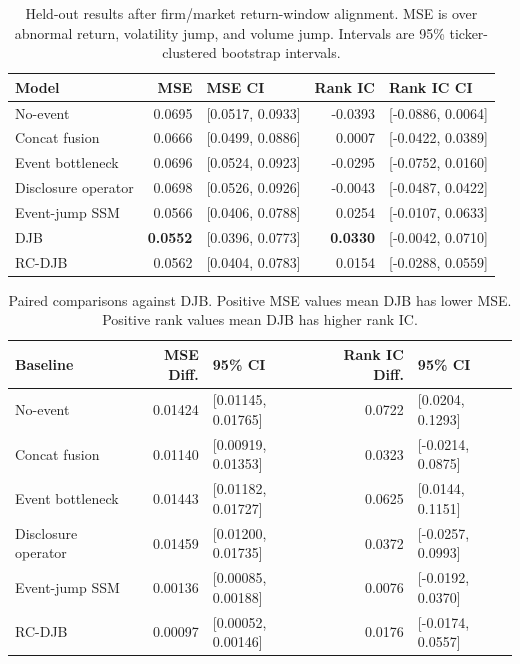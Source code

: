 \documentclass[10pt,letterpaper]{article}
\begin{document}
\begin{table}[H]
\centering
\caption{Held-out results after firm/market return-window alignment. MSE is over
abnormal return, volatility jump, and volume jump. Intervals are 95\% ticker-clustered bootstrap
intervals.}
\label{tab:main-results}
\small
\begin{tabular}{lrlrl}
\toprule
Model & MSE & MSE CI & Rank IC & Rank IC CI \\
\midrule
No-event & 0.0695 & [0.0517, 0.0933] & -0.0393 & [-0.0886, 0.0064] \\
Concat fusion & 0.0666 & [0.0499, 0.0886] & 0.0007 & [-0.0422, 0.0389] \\
Event bottleneck & 0.0696 & [0.0524, 0.0923] & -0.0295 & [-0.0752, 0.0160] \\
Disclosure operator & 0.0698 & [0.0526, 0.0926] & -0.0043 & [-0.0487, 0.0422] \\
Event-jump SSM & 0.0566 & [0.0406, 0.0788] & 0.0254 & [-0.0107, 0.0633] \\
DJB & \textbf{0.0552} & [0.0396, 0.0773] & \textbf{0.0330} & [-0.0042, 0.0710] \\
RC-DJB & 0.0562 & [0.0404, 0.0783] & 0.0154 & [-0.0288, 0.0559] \\
\bottomrule
\end{tabular}
\end{table}

\begin{table}[H]
\centering
\caption{Paired comparisons against DJB. Positive MSE values mean DJB has lower MSE. Positive rank
values mean DJB has higher rank IC.}
\label{tab:paired}
\small
\begin{tabular}{lrlrl}
\toprule
Baseline & MSE Diff. & 95\% CI & Rank IC Diff. & 95\% CI \\
\midrule
No-event & 0.01424 & [0.01145, 0.01765] & 0.0722 & [0.0204, 0.1293] \\
Concat fusion & 0.01140 & [0.00919, 0.01353] & 0.0323 & [-0.0214, 0.0875] \\
Event bottleneck & 0.01443 & [0.01182, 0.01727] & 0.0625 & [0.0144, 0.1151] \\
Disclosure operator & 0.01459 & [0.01200, 0.01735] & 0.0372 & [-0.0257, 0.0993] \\
Event-jump SSM & 0.00136 & [0.00085, 0.00188] & 0.0076 & [-0.0192, 0.0370] \\
RC-DJB & 0.00097 & [0.00052, 0.00146] & 0.0176 & [-0.0174, 0.0557] \\
\bottomrule
\end{tabular}
\end{table}
\end{document}
